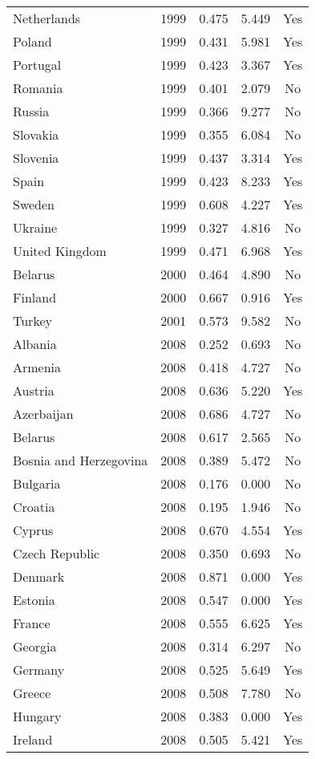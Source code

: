 \documentclass[11pt,]{article}
\begin{document}
\begin{longtable}{lc|ccc}
  Netherlands & 1999 & 0.475 & 5.449 & Yes \\ 
  Poland & 1999 & 0.431 & 5.981 & Yes \\ 
  Portugal & 1999 & 0.423 & 3.367 & Yes \\ 
  Romania & 1999 & 0.401 & 2.079 & No \\ 
  Russia & 1999 & 0.366 & 9.277 & No \\ 
  Slovakia & 1999 & 0.355 & 6.084 & No \\ 
  Slovenia & 1999 & 0.437 & 3.314 & Yes \\ 
  Spain & 1999 & 0.423 & 8.233 & Yes \\ 
  Sweden & 1999 & 0.608 & 4.227 & Yes \\ 
  Ukraine & 1999 & 0.327 & 4.816 & No \\ 
  United Kingdom & 1999 & 0.471 & 6.968 & Yes \\ 
  Belarus & 2000 & 0.464 & 4.890 & No \\ 
  Finland & 2000 & 0.667 & 0.916 & Yes \\ 
  Turkey & 2001 & 0.573 & 9.582 & No \\ 
  Albania & 2008 & 0.252 & 0.693 & No \\ 
  Armenia & 2008 & 0.418 & 4.727 & No \\ 
  Austria & 2008 & 0.636 & 5.220 & Yes \\ 
  Azerbaijan & 2008 & 0.686 & 4.727 & No \\ 
  Belarus & 2008 & 0.617 & 2.565 & No \\ 
  Bosnia and Herzegovina & 2008 & 0.389 & 5.472 & No \\ 
  Bulgaria & 2008 & 0.176 & 0.000 & No \\ 
  Croatia & 2008 & 0.195 & 1.946 & No \\ 
  Cyprus & 2008 & 0.670 & 4.554 & Yes \\ 
  Czech Republic & 2008 & 0.350 & 0.693 & No \\ 
  Denmark & 2008 & 0.871 & 0.000 & Yes \\ 
  Estonia & 2008 & 0.547 & 0.000 & Yes \\ 
  France & 2008 & 0.555 & 6.625 & Yes \\ 
  Georgia & 2008 & 0.314 & 6.297 & No \\ 
  Germany & 2008 & 0.525 & 5.649 & Yes \\ 
  Greece & 2008 & 0.508 & 7.780 & No \\ 
  Hungary & 2008 & 0.383 & 0.000 & Yes \\ 
  Ireland & 2008 & 0.505 & 5.421 & Yes \\ 

\end{longtable}
\end{document}
